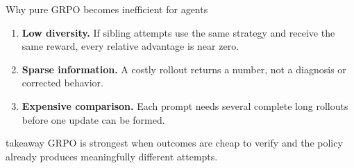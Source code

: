 \begin{frame}[t]{Why pure GRPO becomes inefficient for agents}
  \vspace{2mm}
  \begin{enumerate}
    \setlength{\itemsep}{4mm}
    \item \textbf{Low diversity.} If sibling attempts use the same strategy and receive the same reward, every relative advantage is near zero.
    \item \textbf{Sparse information.} A costly rollout returns a number, not a diagnosis or corrected behavior.
    \item \textbf{Expensive comparison.} Each prompt needs several complete long rollouts before one update can be formed.
  \end{enumerate}

  \vspace{5mm}
  \begin{beamercolorbox}[wd=\textwidth,sep=2mm]{takeaway}
    \large GRPO is strongest when outcomes are cheap to verify and the policy already produces meaningfully different attempts.
  \end{beamercolorbox}

\end{frame}
